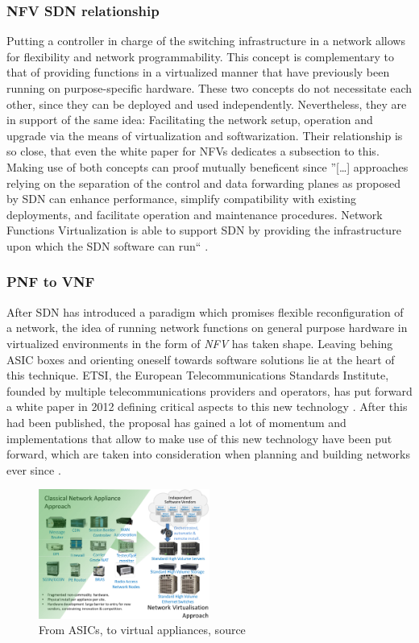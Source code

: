 \subsubsection{NFV SDN relationship}
Putting a controller in charge of the switching infrastructure in a network allows for flexibility and network programmability. This concept is complementary to that of providing functions in a virtualized manner that have previously been running on purpose-specific hardware. These two concepts do not necessitate each other, since they can be deployed and used independently. Nevertheless, they are in support of the same idea: Facilitating the network setup, operation and upgrade via the means of virtualization and softwarization. Their relationship is so close, that even the white paper for NFVs dedicates a subsection to this. Making use of both concepts can proof mutually beneficent since ''[\dots] approaches relying on the separation of the control and data forwarding planes as proposed by SDN can enhance performance, simplify compatibility with existing deployments, and facilitate operation and maintenance procedures. Network Functions Virtualization is able to support SDN by providing the infrastructure upon which the SDN software can run`` \cite{nfv_wp}. 


\subsubsection{PNF to VNF}
After SDN has introduced a paradigm which promises flexible reconfiguration of a network, the idea of running network functions on general purpose hardware in virtualized environments in the form of \textit{NFV} has taken shape. Leaving behing ASIC boxes and orienting oneself towards software solutions lie at the heart of this technique. ETSI, the European Telecommunications Standards Institute, founded by multiple telecommunications providers and operators, has put forward a white paper in 2012 defining critical aspects to this new technology \cite{nfv_wp}. After this had been published, the proposal has gained a lot of momentum and implementations that allow to make use of this new technology have been put forward, which are taken into consideration when planning and building networks ever since \cite{ordonez2017network}.

\begin{figure}[h]
	\centering
	\includegraphics[width=0.5\textwidth]{images/nfv.png}
	\caption{From ASICs, to virtual appliances, source \cite{nfv_wp}}
	\label{img:nfv_wp}
\end{figure}

